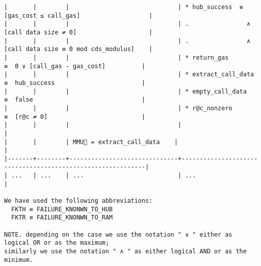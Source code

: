 \documentclass[varwidth=\maxdimen,margin=0.5cm,multi={verbatim}]{standalone}
\begin{document}
\begin{verbatim}
|       |        |                              | * hub_success  ≡   [gas_cost ≤ call_gas]                   |
|       |        |                              | .                ∧ [call data size ≠ 0]                    |
|       |        |                              | .                ∧ [call data size ≡ 0 mod cds_modulus]    |
|       |        |                              | * return_gas         ≡  0 ∨ [call_gas - gas_cost]          |
|       |        |                              | * extract_call_data  ≡  hub_success                        |
|       |        |                              | * empty_call_data    ≡  false                              |
|       |        |                              | * r@c_nonzero        ≡  [r@c ≠ 0]                          |
|       |        |                              |                                                            |
|       |        | MMU🏴 = extract_call_data    |                                                            |
|-------+--------+------------------------------+------------------------------------------------------------|
| ...   | ...    | ...                          | ...                                                        |

We have used the following abbreviations:
  FKTH ≡ FAILURE_KNONWN_TO_HUB
  FKTR ≡ FAILURE_KNONWN_TO_RAM

NOTE. depending on the case we use the notation " ∨ " either as logical OR or as the maximum;
similarly we use the notation " ∧ " as either logical AND or as the minimum.
\end{verbatim}
\end{document}
